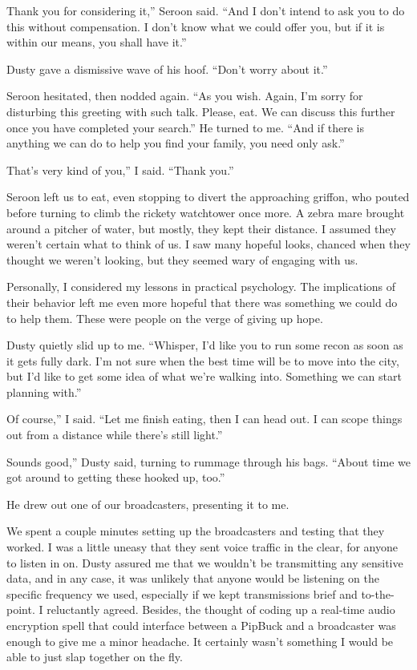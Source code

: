 \leavevmode{}Thank you for considering it,” Seroon said. “And I don’t intend to ask you to do this without compensation. I don’t know what we could offer you, but if it is within our means, you shall have it.”

Dusty gave a dismissive wave of his hoof. “Don’t worry about it.”

Seroon hesitated, then nodded again. “As you wish. Again, I’m sorry for disturbing this greeting with such talk. Please, eat. We can discuss this further once you have completed your search.” He turned to me. “And if there is anything we can do to help you find your family, you need only ask.”

\leavevmode{}That’s very kind of you,” I said. “Thank you.”

Seroon left us to eat, even stopping to divert the approaching griffon, who pouted before turning to climb the rickety watchtower once more. A zebra mare brought around a pitcher of water, but mostly, they kept their distance. I assumed they weren’t certain what to think of us. I saw many hopeful looks, chanced when they thought we weren’t looking, but they seemed wary of engaging with us.

Personally, I considered my lessons in practical psychology. The implications of their behavior left me even more hopeful that there was something we could do to help them. These were people on the verge of giving up hope.

Dusty quietly slid up to me. “Whisper, I’d like you to run some recon as soon as it gets fully dark. I’m not sure when the best time will be to move into the city, but I’d like to get some idea of what we’re walking into. Something we can start planning with.”

\leavevmode{}Of course,” I said. “Let me finish eating, then I can head out. I can scope things out from a distance while there’s still light.”

\leavevmode{}Sounds good,” Dusty said, turning to rummage through his bags. “About time we got around to getting these hooked up, too.”

He drew out one of our broadcasters, presenting it to me.

We spent a couple minutes setting up the broadcasters and testing that they worked. I was a little uneasy that they sent voice traffic in the clear, for anyone to listen in on. Dusty assured me that we wouldn’t be transmitting any sensitive data, and in any case, it was unlikely that anyone would be listening on the specific frequency we used, especially if we kept transmissions brief and to-the-point. I reluctantly agreed. Besides, the thought of coding up a real-time audio encryption spell that could interface between a PipBuck and a broadcaster was enough to give me a minor headache. It certainly wasn’t something I would be able to just slap together on the fly.

